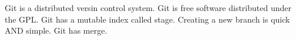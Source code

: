 ﻿Git is a distributed  versin control system.
Git is free software distributed under the GPL.
Git has a mutable index called stage.
Creating a new branch is quick AND simple.
Git has merge.
